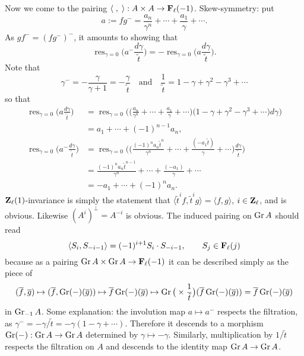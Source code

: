 \documentclass[deligne.tex]{subfiles}
\begin{document}
Now we come to the pairing $\langle\;,\;\rangle:A\times A\rightarrow\mathbf{F}_\ell(-1)$.
Skew-symmetry: put
\begin{equation*}
	a:=fg^-=\frac{a_n}{\gamma^n}+\cdots+\frac{a_1}\gamma+\cdots.
\end{equation*}
As $gf^-=(fg^-)^-$, it amounts to showing that
\begin{equation*}
	\operatorname{res}_{\gamma=0}\Big(a^-\frac{d\gamma}{\tilde t}\Big)
	=-\operatorname{res}_{\gamma=0}\Big(a\frac{d\gamma}{\tilde t}\Big).
\end{equation*}
Note that
\begin{equation*}
	\gamma^-=-\frac{\gamma}{\gamma+1}=-\frac\gamma{\tilde t}\quad\text{and}
	\quad \frac1{\tilde t}=1-\gamma+\gamma^2-\gamma^3+\cdots
\end{equation*}
so that
\begin{align*}
	\operatorname{res}_{\gamma=0}\Big(a\frac{d\gamma}{\tilde t}\Big)
	&=\operatorname{res}_{\gamma=0}\Big(\Big(\frac{a_n}{\gamma^n}+\cdots+\frac{a_1}\gamma+\cdots\Big)\Big(1-\gamma+\gamma^2-\gamma^3+\cdots\Big)d\gamma\Big) \\
	&=a_1+\cdots+(-1)^{n-1}a_n, \\
	\operatorname{res}_{\gamma=0}\Big(a^-\frac{d\gamma}{\tilde t}\Big)
	&=\operatorname{res}_{\gamma=0}\Big(\Big(\frac{(-1)^na_n\tilde t^n}{\gamma^n}+\cdots+\frac{(-a_1\tilde t)}{\gamma}+\cdots\Big)\frac{d\gamma}{\tilde t}\Big) \\
	&=\frac{(-1)^na_n\tilde t^{n-1}}{\gamma^n}+\cdots+\frac{(-a_1)}{\gamma}+\cdots \\
	&=-a_1+\cdots+(-1)^na_n.
\end{align*}
$\mathbf{Z}_\ell(1)$-invariance is simply the statement that
$\langle \tilde t^if,\tilde t^ig\rangle=\langle f,g\rangle$, $i\in\mathbf{Z}_\ell$, 
and is obvious.
Likewise $(A^i)^\perp=A^{-i}$ is obvious. The induced pairing on $\operatorname{Gr} A$
should read
\begin{equation*}
	\langle S_i,S_{-i-1}\rangle=(-1)^{i+1}S_i\cdot S_{-i-1},
	\qquad S_j\in\mathbf{F}_\ell(j)
\end{equation*}
because as a pairing $\operatorname{Gr} A\times\operatorname{Gr} A\rightarrow\mathbf{F}_\ell(-1)$ it can be described 
simply as the piece of
\begin{equation*}
	(\overline f,\overline g)\mapsto(\overline f,\operatorname{Gr}(-)(\overline g))
	\mapsto\overline f\operatorname{Gr}(-)(\overline g)\mapsto\operatorname{Gr}\big(\times\frac1{\tilde t}\big)(\overline f\operatorname{Gr}(-)(\overline g))=\overline f\operatorname{Gr}(-)(\overline g)
\end{equation*}
in $\operatorname{Gr}_{-1}A$. Some explanation: the involution map $a\mapsto a^-$ respects
the filtration, as $\gamma^-=-\gamma/\tilde t=-\gamma(1-\gamma+\cdots)$.
Therefore it descends to a morphism $\operatorname{Gr}(-):\operatorname{Gr} A\rightarrow\operatorname{Gr} A$ determined by
$\gamma\mapsto-\gamma$. Similarly, multiplication by $1/\tilde t$ respects
the filtration on $A$ and descends to the identity map $\operatorname{Gr} A\rightarrow\operatorname{Gr} A$.
\end{document}

